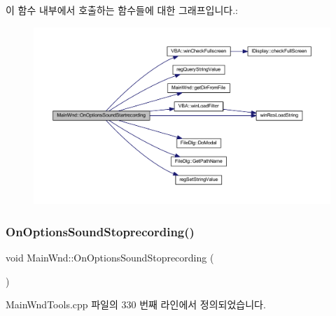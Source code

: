 이 함수 내부에서 호출하는 함수들에 대한 그래프입니다.\+:
\nopagebreak
\begin{figure}[H]
\begin{center}
\leavevmode
\includegraphics[width=350pt]{class_main_wnd_a61b3657a1df45da0e444c99fa5b298c5_cgraph}
\end{center}
\end{figure}
\mbox{\label{class_main_wnd_ab2f36ba26274b2b2d5b9f2cd5d74f9f2}} 
\subsubsection{\texorpdfstring{On\+Options\+Sound\+Stoprecording()}{OnOptionsSoundStoprecording()}}
{\footnotesize\ttfamily void Main\+Wnd\+::\+On\+Options\+Sound\+Stoprecording (\begin{DoxyParamCaption}{ }\end{DoxyParamCaption})\hspace{0.3cm}{\ttfamily [protected]}}



Main\+Wnd\+Tools.\+cpp 파일의 330 번째 라인에서 정의되었습니다.



